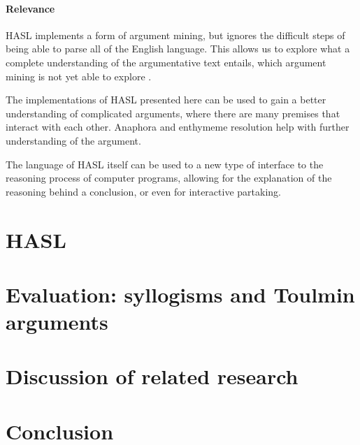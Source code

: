 \documentclass{IOS-Book-Article}
\begin{document}
\paragraph{Relevance}
HASL implements a form of argument mining, but ignores the difficult steps of being able to parse all of the English language. This allows us to explore what a complete understanding of the argumentative text entails, which argument mining is not yet able to explore \cite{stabGurevych2017}.

The implementations of HASL presented here can be used to gain a better understanding of complicated arguments, where there are many premises that interact with each other. Anaphora and enthymeme resolution help with further understanding of the argument.

The language of HASL itself can be used to a new type of interface to the reasoning process of computer programs, allowing for the explanation of the reasoning behind a conclusion, or even for interactive partaking.

\section{HASL}


\section{Evaluation: syllogisms and Toulmin arguments}



\section{Discussion of related research}


\section{Conclusion}


%
%
%
%
%
%
%
%
%
%
%
%
%





\end{document}
